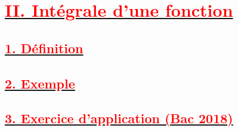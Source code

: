 \documentclass[12pt]{article}
\begin{document}
\section*{\underline{\textbf{\textcolor{red}{II. Intégrale d’une fonction}}}}
\subsection*{\underline{\textbf{\textcolor{red}{1. Définition}}}}
\subsection*{\underline{\textbf{\textcolor{red}{2. Exemple}}}}
\subsection*{\underline{\textbf{\textcolor{red}{3. Exercice d’application (Bac 2018)}}}}
\end{document}
